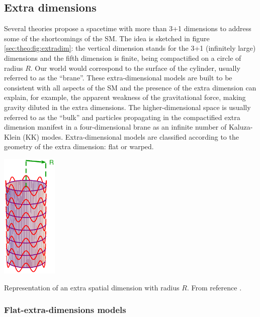 \subsection{Extra dimensions} 

Several theories propose a spacetime with more than 3+1 dimensions to address some of the shortcomings of the SM. The idea is sketched in figure \ref{sec:theo:fig:extradim}: the vertical dimension stands for the 3+1 (infinitely large) dimensions and the fifth dimension is finite, being compactified on a circle of radius $R$. Our world would correspond to the surface of the cylinder, usually referred to as the ``brane''. These extra-dimensional models are built to be consistent with all aspects of the SM and the presence of the extra dimension can explain, for example, the apparent weakness of the gravitational force, making gravity diluted in the extra dimensions. The higher-dimensional space is usually referred to as the ``bulk'' and particles propagating in the compactified extra dimension manifest in a four-dimensional brane as an infinite number of Kaluza-Klein (KK) modes. Extra-dimensional models are classified according to the geometry of the extra dimension: flat or warped.


\bfig[h!]
\centering
\includegraphics[width=0.2\textwidth]{figures/Theory/extradim.eps}
\captionsetup{width=0.85\textwidth} \caption{\small Representation of an extra spatial dimension with radius $R$. From reference \cite{Ponton:2012bi}.}
\label{sec:theo:fig:extradim}
\efig


\subsubsection{Flat-extra-dimensions models} 

